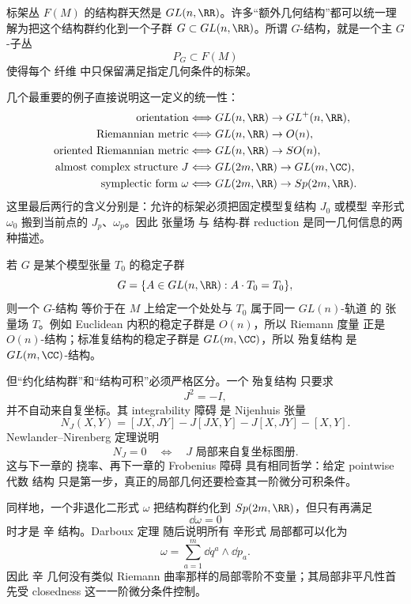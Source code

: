 标架丛 $F(M)$ 的结构群天然是 $GL(n,\RR)$。许多“额外几何结构”都可以统一理解为把这个结构群约化到一个子群 $G\subset GL(n,\RR)$。所谓 $G$-结构，就是一个主 $G$-子丛
\begin{equation*}P_G\subset F(M)\end{equation*}
使得每个 纤维 中只保留满足指定几何条件的标架。

几个最重要的例子直接说明这一定义的统一性：
\begin{align*}
\text{orientation}
&\Longleftrightarrow GL(n,\RR)\to GL^+(n,\RR),\\
\text{Riemannian metric}
&\Longleftrightarrow GL(n,\RR)\to O(n),\\
\text{oriented Riemannian metric}
&\Longleftrightarrow GL(n,\RR)\to SO(n),\\
\text{almost complex structure }J
&\Longleftrightarrow GL(2m,\RR)\to GL(m,\CC),\\
\text{symplectic form }\omega
&\Longleftrightarrow GL(2m,\RR)\to Sp(2m,\RR).
\end{align*}
这里最后两行的含义分别是：允许的标架必须把固定模型复结构 $J_0$ 或模型 辛形式 $\omega_0$ 搬到当前点的 $J_p$、$\omega_p$。因此 张量场 与 结构-群 reduction 是同一几何信息的两种描述。

若 $G$ 是某个模型张量 $T_0$ 的稳定子群
\[
G=\{A\in GL(n,\RR):A\cdot T_0=T_0\},
\]
则一个 $G$-结构 等价于在 $M$ 上给定一个处处与 $T_0$ 属于同一 $GL(n)$-轨道 的 张量场 $T$。例如 Euclidean 内积的稳定子群是 $O(n)$，所以 Riemann 度量 正是 $O(n)$-结构；标准复结构的稳定子群是 $GL(m,\CC)$，所以 殆复结构 是 $GL(m,\CC)$-结构。

但“约化结构群”和“结构可积”必须严格区分。一个 殆复结构 只要求
\[
J^2=-I,
\]
并不自动来自复坐标。其 integrability 障碍 是 Nijenhuis 张量
\begin{equation*}N_J(X,Y)
=[JX,JY]-J[JX,Y]-J[X,JY]-[X,Y].\end{equation*}
Newlander--Nirenberg 定理说明
\[
N_J=0
\quad\Longleftrightarrow\quad
J\text{ 局部来自复坐标图册}.
\]
这与下一章的 挠率、再下一章的 Frobenius 障碍 具有相同哲学：给定 pointwise 代数 结构 只是第一步，真正的局部几何还要检查其一阶微分可积条件。

同样地，一个非退化二形式 $\omega$ 把结构群约化到 $Sp(2m,\RR)$，但只有再满足
\begin{equation*}\dd\omega=0\end{equation*}
时才是 辛 结构。Darboux 定理 随后说明所有 辛形式 局部都可以化为
\[
\omega=\sum_{a=1}^m\dd q^a\wedge\dd p_a.
\]
因此 辛 几何没有类似 Riemann 曲率那样的局部零阶不变量；其局部非平凡性首先受 closedness 这一一阶微分条件控制。

